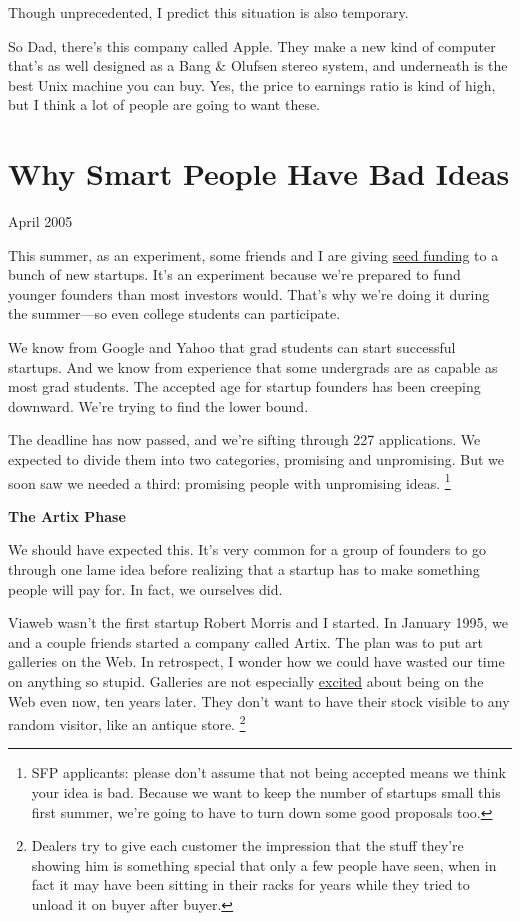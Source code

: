 \documentclass[12pt]{book}
\begin{document}
Though unprecedented, I predict this situation is also temporary.

So Dad, there's this company called Apple. They make a new kind of
computer that's as well designed as a Bang \& Olufsen stereo system, and
underneath is the best Unix machine you can buy. Yes, the price to
earnings ratio is kind of high, but I think a lot of people are going to
want these.
\chapter{Why Smart People Have Bad Ideas}

April 2005

This summer, as an experiment, some friends and I are giving
\href{http://ycombinator.com}{seed funding} to a bunch of new startups.
It's an experiment because we're prepared to fund younger founders than
most investors would. That's why we're doing it during the summer---so
even college students can participate.

We know from Google and Yahoo that grad students can start successful
startups. And we know from experience that some undergrads are as
capable as most grad students. The accepted age for startup founders has
been creeping downward. We're trying to find the lower bound.

The deadline has now passed, and we're sifting through 227 applications.
We expected to divide them into two categories, promising and
unpromising. But we soon saw we needed a third: promising people with
unpromising ideas. \footnote{SFP applicants: please don't assume that not being accepted
means we think your idea is bad. Because we want to keep the number of
startups small this first summer, we're going to have to turn down some
good proposals too.}

\textbf{The Artix Phase}

We should have expected this. It's very common for a group of founders
to go through one lame idea before realizing that a startup has to make
something people will pay for. In fact, we ourselves did.

Viaweb wasn't the first startup Robert Morris and I started. In January
1995, we and a couple friends started a company called Artix. The plan
was to put art galleries on the Web. In retrospect, I wonder how we
could have wasted our time on anything so stupid. Galleries are not
especially \href{http://www.knoedlergallery.com/}{excited} about being
on the Web even now, ten years later. They don't want to have their
stock visible to any random visitor, like an antique store.
\footnote{Dealers try to give each customer the impression that the stuff
they're showing him is something special that only a few people have
seen, when in fact it may have been sitting in their racks for years
while they tried to unload it on buyer after buyer.}
\end{document}
